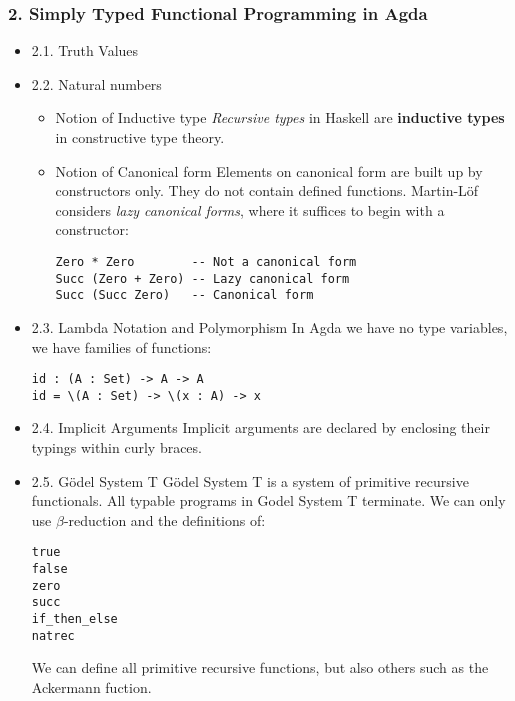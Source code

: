 \documentclass[11pt]{article}
\begin{document}
\subsubsection*{2. Simply Typed Functional Programming in Agda}
\label{sec-1-1-2}
\begin{itemize}
\item 2.1. Truth Values
\label{sec-1-1-2-1}
\item 2.2. Natural numbers
\label{sec-1-1-2-2}
\begin{itemize}
\item Notion of Inductive type
\label{sec-1-1-2-2-1}
\emph{Recursive types} in Haskell are \textbf{inductive types} in constructive type
theory.
\item Notion of Canonical form
\label{sec-1-1-2-2-2}
Elements on canonical form are built up by constructors only. They do not
contain defined functions. Martin-Löf considers \emph{lazy canonical forms}, where
it suffices to begin with a constructor:

\begin{verbatim}
Zero * Zero        -- Not a canonical form
Succ (Zero + Zero) -- Lazy canonical form
Succ (Succ Zero)   -- Canonical form
\end{verbatim}
\end{itemize}

\item 2.3. Lambda Notation and Polymorphism
\label{sec-1-1-2-3}
In Agda we have no type variables, we have families of functions:

\begin{verbatim}
id : (A : Set) -> A -> A
id = \(A : Set) -> \(x : A) -> x
\end{verbatim}

\item 2.4. Implicit Arguments
\label{sec-1-1-2-4}
Implicit arguments are declared by enclosing their typings within curly 
braces.

\item 2.5. Gödel System T
\label{sec-1-1-2-5}
Gödel System T is a system of primitive recursive functionals. All typable
programs in Godel System T terminate. We can only use $\beta$-reduction and the
definitions of:

\begin{verbatim}
true
false
zero
succ
if_then_else
natrec
\end{verbatim}

We can define all primitive recursive functions, but also others such as the
Ackermann fuction.


\end{itemize}
\end{document}
